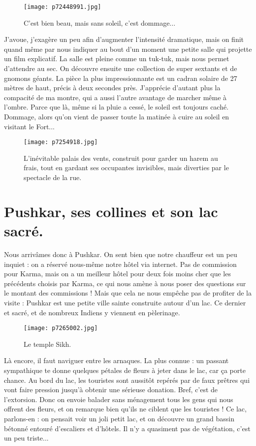 \documentclass{book}
\begin{document}
\begin{figure}[h]
\centering
\texttt{[image: p72448991.jpg]}
\caption*{C'est bien beau, mais sans soleil, c'est dommage...}
\end{figure}

J'avoue, j'exagère un peu afin d'augmenter l'intensité dramatique, mais on finit quand même par nous indiquer au bout d'un moment une petite salle qui projette un film explicatif. La salle est pleine comme un tuk-tuk, mais nous permet d'attendre au sec. On découvre ensuite une collection de super sextants et de gnomons géants. La pièce la plus impressionnante est un cadran solaire de 27 mètres de haut, précis à deux secondes près. J'apprécie d'autant plus la compacité de ma montre, qui a aussi l'autre avantage de marcher même à l'ombre. Parce que là, même si la pluie a cessé, le soleil est toujours caché. Dommage, alors qu'on vient de passer toute la matinée à cuire au soleil en visitant le Fort...


\begin{figure}[h]
\centering
\texttt{[image: p7254918.jpg]}
\caption*{L'inévitable palais des vents, construit pour garder un harem au frais, tout en gardant ses occupantes invisibles, mais diverties par le spectacle de la rue.}
\end{figure}





\chapter{Pushkar, ses collines et son lac sacré.}
Nous arrivâmes donc à Pushkar. On sent bien que notre chauffeur est un peu inquiet : on a réservé nous-même notre hôtel via internet. Pas de commission pour Karma, mais on a un meilleur hôtel pour deux fois moins cher que les précédents choisis par Karma, ce qui nous amène à nous poser des questions sur le montant des commissions ! Mais que cela ne nous empêche pas de profiter de la visite : Pushkar est une petite ville sainte construite autour d'un lac. Ce dernier et sacré, et de nombreux Indiens y viennent en pèlerinage.


\begin{figure}[h]
\centering
\texttt{[image: p7265002.jpg]}
\caption*{Le temple Sikh.}
\end{figure}

Là encore, il faut naviguer entre les arnaques. La plus connue : un passant sympathique te donne quelques pétales de fleurs à jeter dans le lac, car ça porte chance. Au bord du lac, les touristes sont aussitôt repérés par de faux prêtres qui vont faire pression jusqu'à obtenir une sérieuse donation. Bref, c'est de l'extorsion. Donc on envoie balader sans ménagement tous les gens qui nous offrent des fleurs, et on remarque bien qu'ils ne ciblent que les touristes ! Ce lac, parlons-en : on pensait voir un joli petit lac, et on découvre un grand bassin bétonné entouré d'escaliers et d'hôtels. Il n'y a quasiment pas de végétation, c'est un peu triste...
\end{document}
